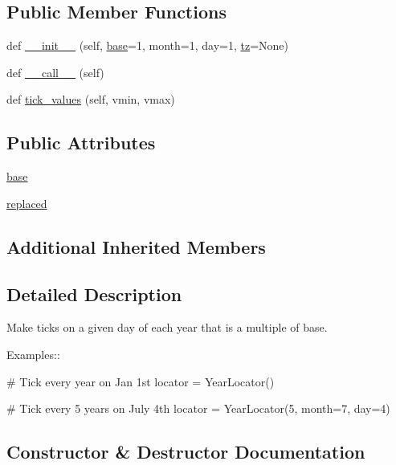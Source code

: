 \subsection*{Public Member Functions}
\begin{DoxyCompactItemize}
\item 
def \hyperlink{classmatplotlib_1_1dates_1_1YearLocator_a19d451ca4955a0ca8cbb8c693c7b7de1}{\+\_\+\+\_\+init\+\_\+\+\_\+} (self, \hyperlink{classmatplotlib_1_1dates_1_1YearLocator_aa35cba0133bd844f4893b1d419d7daa5}{base}=1, month=1, day=1, \hyperlink{classmatplotlib_1_1dates_1_1DateLocator_aa18faf34dbf00ed4820535b64cd7194e}{tz}=None)
\item 
def \hyperlink{classmatplotlib_1_1dates_1_1YearLocator_af326b5d1753aea05e7c5c12780d2a428}{\+\_\+\+\_\+call\+\_\+\+\_\+} (self)
\item 
def \hyperlink{classmatplotlib_1_1dates_1_1YearLocator_ae8653c4a2c8a666223ae548e739dfbcc}{tick\+\_\+values} (self, vmin, vmax)
\end{DoxyCompactItemize}
\subsection*{Public Attributes}
\begin{DoxyCompactItemize}
\item 
\hyperlink{classmatplotlib_1_1dates_1_1YearLocator_aa35cba0133bd844f4893b1d419d7daa5}{base}
\item 
\hyperlink{classmatplotlib_1_1dates_1_1YearLocator_ae7b562cf73318408b5573d1faa8cd7f3}{replaced}
\end{DoxyCompactItemize}
\subsection*{Additional Inherited Members}


\subsection{Detailed Description}
\begin{DoxyVerb}Make ticks on a given day of each year that is a multiple of base.

Examples::

  # Tick every year on Jan 1st
  locator = YearLocator()

  # Tick every 5 years on July 4th
  locator = YearLocator(5, month=7, day=4)
\end{DoxyVerb}
 

\subsection{Constructor \& Destructor Documentation}
\mbox{\label{classmatplotlib_1_1dates_1_1YearLocator_a19d451ca4955a0ca8cbb8c693c7b7de1}} 
